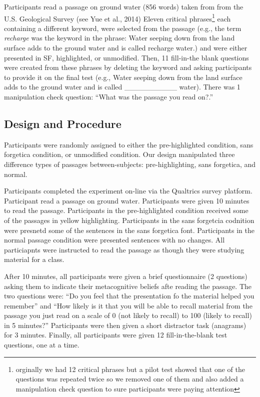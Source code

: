 \documentclass[doc]{apa6}
\begin{document}
Participants read a passage on ground water (856 words) taken from from the U.S. Geological Survey (see Yue et al., 2014) Eleven critical phrases\footnote{orginally we had 12 critical phrases but a pilot test showed that one of the questions was repeated twice so we removed one of them and also added a manipulation check question to sure participants were paying attention} each containing a different keyword, were selected from the passage (e.g., the term \emph{recharge} was the keyword in the phrase: Water seeping down from the land surface adds to the ground water and is called recharge water.) and were either presented in SF, highlighted, or unmodified. Then, 11 fill-in-the blank questions were created from these phrases by deleting the keyword and asking participants to provide it on the final test (e.g., Water seeping down from the land surface adds to the ground water and is called \_\_\_\_\_\_\_\_\_\_ water). There was 1 manipulation check question: \enquote{What was the passage you read on?.}

\hypertarget{design-and-procedure-1}{%
\subsection{Design and Procedure}\label{design-and-procedure-1}}

Participants were randomly assigned to either the pre-highlighted condition, sans forgetica condition, or unmodified condition. Our design manipulated three difference types of passages between-subjects: pre-highlighting, sans forgetica, and normal.

Participants completed the experiment on-line via the Qualtrics survey platform. Participant read a passage on ground water. Participants were given 10 minutes to read the passage. Participants in the pre-highlighted condition received some of the passages in yellow highlighting. Participants in the sans forgetcia codnition were presnetd some of the sentences in the sans forgetica font. Participants in the normal passage condition were presented sentences with no changes. All particiapnts were instructed to read the passage as though they were studying material for a class.

After 10 minutes, all participants were given a brief questionnaire (2 questions) asking them to indicate their metacognitive beliefs afte reading the passage. The two questions were: \enquote{Do you feel that the presentation fo the material helped you remember} and \enquote{How likely is it that you will be able to recall material from the passage you just read on a scale of 0 (not likely to recall) to 100 (likely to recall) in 5 minutes?} Participants were then given a short distractor task (anagrams) for 3 minutes. Finally, all participants were given 12 fill-in-the-blank test questions, one at a time.
\end{document}
